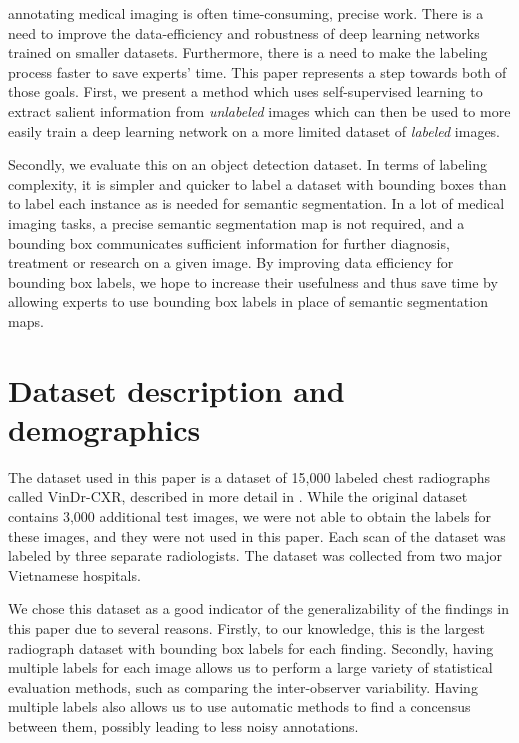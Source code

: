 \documentclass[conference]{IEEEtran}
\begin{document}
annotating medical imaging is often time-consuming, precise work. There is a need to improve the 
data-efficiency and robustness of deep learning networks trained on smaller datasets. Furthermore, 
there is a need to make the labeling process faster to save experts' time. This paper represents a 
step towards both of those goals. First, we present a method which uses self-supervised learning 
to extract salient information from \textit{unlabeled} images which can then be used to more 
easily train a deep learning network on a more limited dataset of \textit{labeled} images.


Secondly, we evaluate this on an object detection dataset. In terms of labeling complexity, it is 
simpler and quicker to label a dataset with bounding boxes than to label each instance as is 
needed for semantic segmentation. In a lot of medical imaging tasks, a precise semantic 
segmentation map is not required, and a bounding box communicates sufficient information for 
further diagnosis, treatment or research on a given image. By improving data efficiency for 
bounding box labels, we hope to increase their usefulness and thus save time by allowing experts 
to use bounding box labels in place of semantic segmentation maps.

\section{Dataset description and demographics}\label{dataset}

The dataset used in this paper is a dataset of 15,000 labeled chest radiographs called VinDr-CXR, 
described in more detail in \cite{nguyenVinDrCXROpenDataset2021}. While the original dataset 
contains 3,000 additional test images, we were not able to obtain the labels for these images, and 
they were not used in this paper. Each scan of the dataset was labeled by three separate 
radiologists.  The dataset was collected from two major Vietnamese hospitals. 

We chose this dataset as a good indicator of the generalizability of the findings in this paper 
due to several reasons. Firstly, to our knowledge, this is the largest radiograph dataset with 
bounding box labels for each finding. Secondly, having multiple labels for each image allows us to 
perform a large variety of statistical evaluation methods, such as comparing the inter-observer 
variability. Having multiple labels also allows us to use automatic methods to find a concensus 
between them, possibly leading to less noisy annotations.
\end{document}
